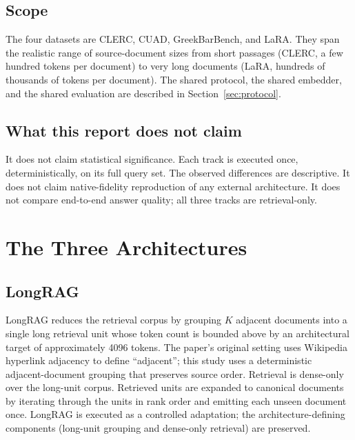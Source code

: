 \documentclass[11pt,a4paper]{article}
\begin{document}
\subsection{Scope}
The four datasets are CLERC, CUAD, GreekBarBench, and LaRA. They
span the realistic range of source-document sizes from short
passages (CLERC, a few hundred tokens per document) to very long
documents (LaRA, hundreds of thousands of tokens per document).
The shared protocol, the shared embedder, and the shared evaluation
are described in Section~\ref{sec:protocol}.

\subsection{What this report does not claim}
It does not claim statistical significance. Each track is executed
once, deterministically, on its full query set. The observed
differences are descriptive. It does not claim native-fidelity
reproduction of any external architecture. It does not compare
end-to-end answer quality; all three tracks are retrieval-only.

\section{The Three Architectures}\label{sec:arch}

\subsection{LongRAG}
LongRAG reduces the retrieval corpus by grouping $K$ adjacent
documents into a single long retrieval unit whose token count is
bounded above by an architectural target of approximately
\num{4096} tokens. The paper's original setting uses Wikipedia
hyperlink adjacency to define ``adjacent''; this study uses a
deterministic adjacent-document grouping that preserves source
order. Retrieval is dense-only over the long-unit corpus. Retrieved
units are expanded to canonical documents by iterating through the
units in rank order and emitting each unseen document once.
LongRAG is executed as a controlled adaptation; the
architecture-defining components (long-unit grouping and dense-only
retrieval) are preserved.
\end{document}
